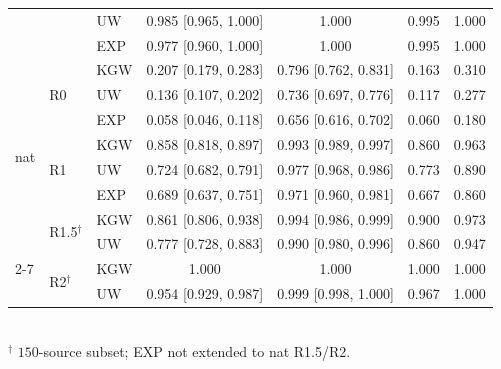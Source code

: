 \begin{table}[t]
\begin{tabular}{l l l c c c c}
                      &                        & UW  & 0.985 [0.965, 1.000] & 1.000 & 0.995 & 1.000 \\
                      &                        & EXP & 0.977 [0.960, 1.000] & 1.000 & 0.995 & 1.000 \\
\midrule
\multirow{8}{*}{nat}  & \multirow{3}{*}{R0}   & KGW & 0.207 [0.179, 0.283] & 0.796 [0.762, 0.831] & 0.163 & 0.310 \\
                      &                        & UW  & 0.136 [0.107, 0.202] & 0.736 [0.697, 0.776] & 0.117 & 0.277 \\
                      &                        & EXP & 0.058 [0.046, 0.118] & 0.656 [0.616, 0.702] & 0.060 & 0.180 \\
\cmidrule(l){2-7}
                      & \multirow{3}{*}{R1}   & KGW & 0.858 [0.818, 0.897] & 0.993 [0.989, 0.997] & 0.860 & 0.963 \\
                      &                        & UW  & 0.724 [0.682, 0.791] & 0.977 [0.968, 0.986] & 0.773 & 0.890 \\
                      &                        & EXP & 0.689 [0.637, 0.751] & 0.971 [0.960, 0.981] & 0.667 & 0.860 \\
\cmidrule(l){2-7}
                      & \multirow{2}{*}{R1.5$^\dagger$} & KGW & 0.861 [0.806, 0.938] & 0.994 [0.986, 0.999] & 0.900 & 0.973 \\
                      &                                  & UW  & 0.777 [0.728, 0.883] & 0.990 [0.980, 0.996] & 0.860 & 0.947 \\
\cmidrule(l){2-7}
                      & \multirow{2}{*}{R2$^\dagger$}   & KGW & 1.000 & 1.000 & 1.000 & 1.000 \\
                      &                                  & UW  & 0.954 [0.929, 0.987] & 0.999 [0.998, 1.000] & 0.967 & 1.000 \\
\bottomrule
\end{tabular}
\\[2pt]
{\footnotesize $^\dagger$ $150$-source subset; EXP not extended to nat R1.5/R2.}
\end{table}
